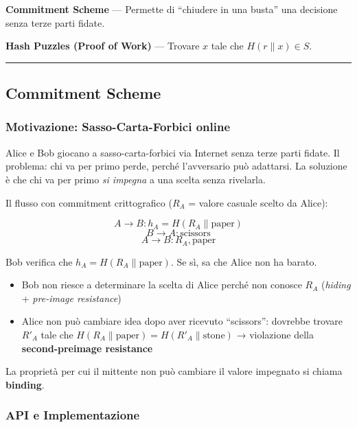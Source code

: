 \documentclass[
  italian,
  openany]{book}
\providecommand{\tightlist}{%
  \setlength{\itemsep}{0pt}\setlength{\parskip}{0pt}}
\begin{document}
\textbf{Commitment Scheme} --- Permette di ``chiudere in una busta'' una
decisione senza terze parti fidate.

\textbf{Hash Puzzles (Proof of Work)} --- Trovare \(x\) tale che
\(H(r \| x) \in S\).

\begin{center}\rule{0.5\linewidth}{0.5pt}\end{center}

\subsection{Commitment Scheme}\label{commitment-scheme}

\subsubsection{Motivazione: Sasso-Carta-Forbici
online}\label{motivazione-sasso-carta-forbici-online}

Alice e Bob giocano a sasso-carta-forbici via Internet senza terze parti
fidate. Il problema: chi va per primo perde, perché l'avversario può
adattarsi. La soluzione è che chi va per primo \emph{si impegna} a una
scelta senza rivelarla.

Il flusso con commitment crittografico (\(R_A\) = valore casuale scelto
da Alice):

\[A \to B: h_A = H(R_A \| \text{paper})\] \[B \to A: \text{scissors}\]
\[A \to B: R_A, \text{paper}\]

Bob verifica che \(h_A = H(R_A \| \text{paper})\). Se sì, sa che Alice
non ha barato.

\begin{itemize}
\tightlist
\item
  Bob non riesce a determinare la scelta di Alice perché non conosce
  \(R_A\) (\emph{hiding} + \emph{pre-image resistance})
\item
  Alice non può cambiare idea dopo aver ricevuto ``scissors'': dovrebbe
  trovare \(R'_A\) tale che
  \(H(R_A \| \text{paper}) = H(R'_A \| \text{stone})\) → violazione
  della \textbf{second-preimage resistance}
\end{itemize}

La proprietà per cui il mittente non può cambiare il valore impegnato si
chiama \textbf{binding}.

\subsubsection{API e Implementazione}\label{api-e-implementazione}
\end{document}
